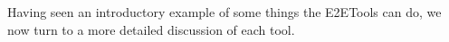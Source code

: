 






Having seen an introductory example of some things the E2ETools can do, we
now turn to a more detailed discussion of each tool.

